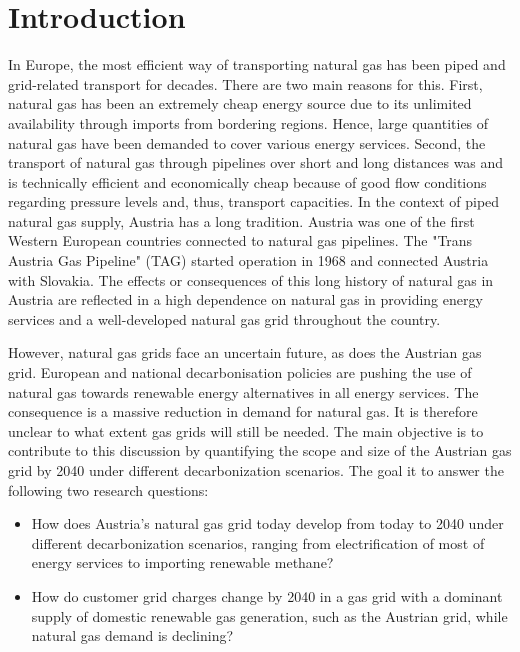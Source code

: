 \section{Introduction}

In Europe, the most efficient way of transporting natural gas has been piped and grid-related transport for decades. There are two main reasons for this. First, natural gas has been an extremely cheap energy source due to its unlimited availability through imports from bordering regions. Hence, large quantities of natural gas have been demanded to cover various energy services. Second, the transport of natural gas through pipelines over short and long distances was and is technically efficient and economically cheap because of good flow conditions regarding pressure levels and, thus, transport capacities. In the context of piped natural gas supply, Austria has a long tradition. Austria was one of the first Western European countries connected to natural gas pipelines. The "Trans Austria Gas Pipeline" (TAG) started operation in 1968 and connected Austria with Slovakia. The effects or consequences of this long history of natural gas in Austria are reflected in a high dependence on natural gas in providing energy services and a well-developed natural gas grid throughout the country.\vspace{0.3cm}

However, natural gas grids face an uncertain future, as does the Austrian gas grid. European and national decarbonisation policies are pushing the use of natural gas towards renewable energy alternatives in all energy services. The consequence is a massive reduction in demand for natural gas. It is therefore unclear to what extent gas grids will still be needed. The main objective is to contribute to this discussion by quantifying the scope and size of the Austrian gas grid by 2040 under different decarbonization scenarios. The goal it to answer the following two research questions:

\begin{itemize}
	\item How does Austria's natural gas grid today develop from today to 2040 under different decarbonization scenarios, ranging from electrification of most of energy services to importing renewable methane?
	\item How do customer grid charges change by 2040 in a gas grid with a dominant supply of domestic renewable gas generation, such as the Austrian grid, while natural gas demand is declining?
\end{itemize}

